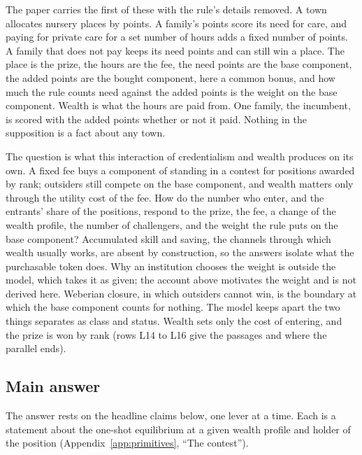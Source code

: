 The paper carries the first of these with the rule's details removed. A town
allocates nursery places by points. A family's points score its need for care,
and paying for private care for a set number of hours adds a fixed number of
points. A family that does not pay keeps its need points and can still win a
place. The place is the prize, the hours are the fee, the need points are the
base component, the added points are the bought component, here a common
bonus, and how much the rule counts need against the added points is the weight
on the base component. Wealth is what the hours are paid from. One family, the
incumbent, is scored with the added points whether or not it paid. Nothing in
the supposition is a fact about any town.

The question is what this interaction of credentialism and wealth produces on
its own. A fixed fee buys a component of standing in a contest for positions
awarded by rank; outsiders still compete on the base component, and wealth
matters only through the utility cost of the fee. How do the number who enter,
and the entrants' share of the positions, respond to the prize, the fee, a
change of the wealth profile, the number of challengers, and the weight the rule puts on
the base component? Accumulated skill and saving, the channels through which
wealth usually works, are absent by construction, so the answers isolate what
the purchasable token does. Why an institution chooses the weight is outside
the model, which takes it as given; the account above motivates the weight and is not derived here. Weberian closure, in which
outsiders cannot win, is the boundary at which the base component counts for
nothing. The model keeps apart the two things \citet{Weber1978} separates as
class and status. Wealth sets only the cost of entering, and the prize is won
by rank (rows L14 to L16 give the passages and where the parallel ends).

\subsection{Main answer}
\label{sec:answer}

The answer rests on the headline claims below, one lever at a time. Each is a
statement about the one-shot equilibrium at a given wealth profile and holder
of the position (Appendix~\ref{app:primitives}, ``The contest'').

